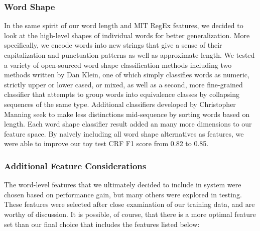 \documentclass[preprint]{style}
\begin{document}
\subsubsection{Word Shape}
In the same spirit of our word length and MIT RegEx features, we decided to look at the high-level shapes of individual words for better generalization. More specifically, we encode words into new strings that give a sense of their capitalization and punctuation patterns as well as approximate length. We tested a variety of open-sourced word shape classification methods including two methods written by Dan Klein, one of which simply classifies words as numeric, strictly upper or lower cased, or mixed, as well as a second, more fine-grained classifier that attempts to group words into equivalence classes by collapsing sequences of the same type. Additional classifiers developed by Christopher Manning seek to make less distinctions mid-sequence by sorting words based on length. Each word shape classifier result added an many more dimensions to our feature space. By naively including all word shape alternatives as features, we were able to improve our toy test CRF F1 score from 0.82 to 0.85.

\subsubsection{Additional Feature Considerations}
The word-level features that we ultimately decided to include in system were chosen based on performance gain, but many others were explored in testing. These features were selected after close examination of our training data, and are worthy of discussion. It is possible, of course, that there is a more optimal feature set than our final choice that includes the features listed below:
\end{document}
